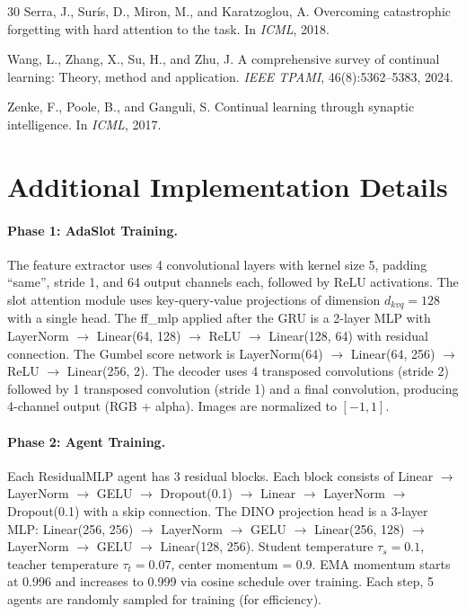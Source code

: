 \documentclass{article}
\begin{document}
\begin{thebibliography}{30}
Serra, J., Sur\'{i}s, D., Miron, M., and Karatzoglou, A.
\newblock Overcoming catastrophic forgetting with hard attention to the task.
\newblock In \emph{ICML}, 2018.

Wang, L., Zhang, X., Su, H., and Zhu, J.
\newblock A comprehensive survey of continual learning: Theory, method and application.
\newblock \emph{IEEE TPAMI}, 46(8):5362--5383, 2024.

Zenke, F., Poole, B., and Ganguli, S.
\newblock Continual learning through synaptic intelligence.
\newblock In \emph{ICML}, 2017.

\end{thebibliography}


\newpage
\appendix
\section{Additional Implementation Details}
\label{app:details}

\paragraph{Phase 1: AdaSlot Training.}
The feature extractor uses 4 convolutional layers with kernel size 5, padding ``same'', stride 1, and 64 output channels each, followed by ReLU activations.
The slot attention module uses key-query-value projections of dimension $d_{kvq} = 128$ with a single head.
The ff\_mlp applied after the GRU is a 2-layer MLP with LayerNorm $\to$ Linear(64, 128) $\to$ ReLU $\to$ Linear(128, 64) with residual connection.
The Gumbel score network is LayerNorm(64) $\to$ Linear(64, 256) $\to$ ReLU $\to$ Linear(256, 2).
The decoder uses 4 transposed convolutions (stride 2) followed by 1 transposed convolution (stride 1) and a final convolution, producing 4-channel output (RGB + alpha).
Images are normalized to $[-1, 1]$.

\paragraph{Phase 2: Agent Training.}
Each ResidualMLP agent has 3 residual blocks.
Each block consists of Linear $\to$ LayerNorm $\to$ GELU $\to$ Dropout(0.1) $\to$ Linear $\to$ LayerNorm $\to$ Dropout(0.1) with a skip connection.
The DINO projection head is a 3-layer MLP: Linear(256, 256) $\to$ LayerNorm $\to$ GELU $\to$ Linear(256, 128) $\to$ LayerNorm $\to$ GELU $\to$ Linear(128, 256).
Student temperature $\tau_s = 0.1$, teacher temperature $\tau_t = 0.07$, center momentum = 0.9.
EMA momentum starts at 0.996 and increases to 0.999 via cosine schedule over training.
Each step, 5 agents are randomly sampled for training (for efficiency).
\end{document}
